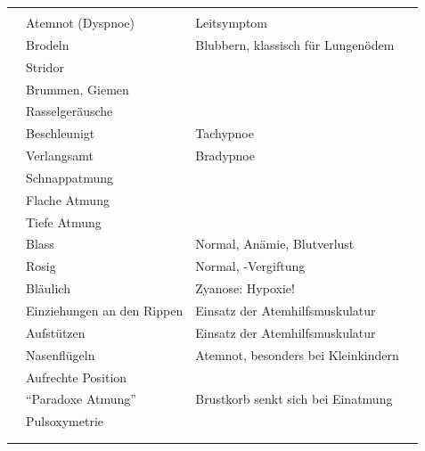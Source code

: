 \begin{table}[H]

\begin{tabulary}{\linewidth}[H]{LLLL}
\addlinespace
{}
 &
 &
 &
\\\addlinespace\midrule\addlinespace
{}
 &
Atemnot (Dyspnoe) 
 &
Leitsymptom
 &
\\\addlinespace
{}
 &
Brodeln 
 &
Blubbern, klassisch für Lungenödem
 &
\\\addlinespace
 &
Stridor 
 &
 &
\\\addlinespace
 &
Brummen, Giemen
& &
\\\addlinespace
 &
Rasselgeräusche 
 &
 &
\\\addlinespace
{}
 &
Beschleunigt
 &
Tachypnoe 
 &
\\\addlinespace
 &
Verlangsamt
 &
Bradypnoe 
 &
\\\addlinespace
{}
 &
Schnappatmung
 &
 &
\\\addlinespace
 &
Flache Atmung
 &
 &
\\\addlinespace
 &
Tiefe Atmung
 &
 &
\\\addlinespace
{}
 &
Blass
 &
Normal, Anämie, Blutverlust
 &
\\\addlinespace
 &
Rosig
 &
Normal, -Vergiftung
 &
\\\addlinespace
 &
Bläulich 
 &
Zyanose: Hypoxie!
 &
\\\addlinespace
{}
 &
Einziehungen an den Rippen
&
Einsatz der Atemhilfsmuskulatur
&
\\\addlinespace
&
Aufstützen
&
Einsatz der Atemhilfsmuskulatur
&
\\\addlinespace
&
Nasenflügeln 
&
Atemnot, besonders bei Kleinkindern
&
\\\addlinespace
&
Aufrechte Position
&
&
\\\addlinespace
&
"`Paradoxe Atmung"'
&
Brustkorb senkt sich bei Einatmung
&
\\\addlinespace
{}
&
Pulsoxymetrie
&
&
\\\addlinespace
&
&
\\\addlinespace\bottomrule
\end{tabulary}
\end{table}





